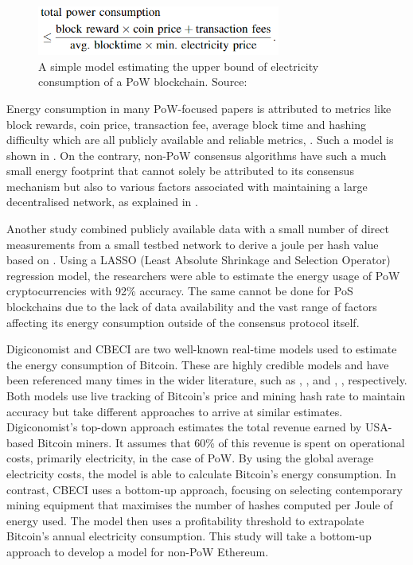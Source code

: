 \begin{figure}[h]
    \centering
    \includegraphics[width=8cm,center]{Figures/SimplePoWModel.png}
    \caption{A simple model estimating the upper bound of electricity consumption of a PoW blockchain. Source: \cite{Sedlmeir2020TheMyth} }
    \label{Figure:SimplePoWModel}
\end{figure}

Energy consumption in many PoW-focused papers is attributed to metrics like block rewards, coin price, transaction fee, average block time and hashing difficulty which are all publicly available and reliable metrics, \cite{Mcdonald2022EthereumEstimate}. Such a model is shown in . On the contrary, non-PoW consensus algorithms have such a much small energy footprint that cannot solely be attributed to its consensus mechanism but also to various factors associated with maintaining a large decentralised network, as explained in . 

Another study combined publicly available data with a small number of direct measurements from a small testbed network to derive a joule per hash value based on \cite{Cole2018ModelingAlgorithms}. Using a LASSO (Least Absolute Shrinkage and Selection Operator) regression model, the researchers were able to estimate the energy usage of PoW cryptocurrencies with 92\% accuracy. The same cannot be done for PoS blockchains due to the lack of data availability and the vast range of factors affecting its energy consumption outside of the consensus protocol itself.

Digiconomist \cite{BitcoinDigiconomist} and CBECI \cite{CambridgeCBECI} are two well-known real-time models used to estimate the energy consumption of Bitcoin. These are highly credible models and have been referenced many times in the wider literature, such as \cite{Cole2018ModelingAlgorithms}, \cite{Lei2021BestRecommendations}, and \cite{Erdogan2022AnalyzingSustainability}, \cite{Platt2022TheProof-of-Work}, respectively. Both models use live tracking of Bitcoin's price and mining hash rate to maintain accuracy but take different approaches to arrive at similar estimates. Digiconomist's top-down approach estimates the total revenue earned by USA-based Bitcoin miners. It assumes that 60\% of this revenue is spent on operational costs, primarily electricity, in the case of PoW. By using the global average electricity costs, the model is able to calculate Bitcoin's energy consumption. In contrast, CBECI uses a bottom-up approach, focusing on selecting contemporary mining equipment that maximises the number of hashes computed per Joule of energy used. The model then uses a profitability threshold to extrapolate Bitcoin's annual electricity consumption. This study will take a bottom-up approach to develop a model for non-PoW Ethereum.


